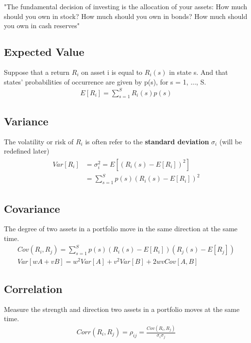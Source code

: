 "The fundamental decision of investing is the allocation of your assets: How much should you own in stock? How much should you own in bonds? How much should you own in cash reserves"

\begin{multicols}{2}
    
\subsection{Expected Value}
Suppose that a return $R_i$ on asset i is equal to $R_i(s)$ in state s. And that states'
probabilities of occurrence are given by p(s), for s = 1, ..., S.
\begin{gather*}
    E[R_i] = \sum_{s=1}^{S}R_i(s)p(s)
\end{gather*}

\subsection{Variance}
The volatility or risk of $R_i$ is often refer to the \textbf{standard deviation} $\sigma_i$ (will be redefined later)
\begin{gather*}
    \begin{split}
        Var[R_i] &= \sigma_i^2 = E[(R_i(s)-E[R_i])^2]\\
        &= \sum_{s=1}^{S}p(s)(R_i(s)-E[R_i])^2
    \end{split}
\end{gather*}

\subsection{Covariance}
The degree of two assets in a portfolio move in the same direction at the same time.
\begin{gather*}
    Cov(R_i,R_j) = \sum_{s=1}^{S}p(s)(R_i(s)-E[R_i])(R_j(s)-E[R_j])\\
    Var[wA+vB] = w^2Var[A]+v^2Var[B] + 2wvCov[A,B]
\end{gather*}

\subsection{Correlation}
Measure the strength and direction two assets in a portfolio moves at the same time. 
\begin{gather*}
    Corr(R_i,R_j) = \rho_{ij}=\frac{Cov(R_i,R_j)}{\sigma_i\sigma_j}
\end{gather*}


\end{multicols}
